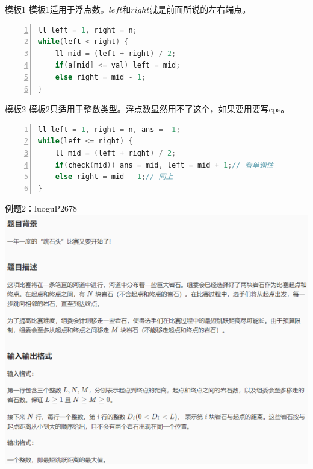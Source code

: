 \documentclass{beamer}[UTF-8]
\begin{document}
\begin{frame}{模板1}
 \pause
模板1适用于浮点数。$left$和$right$就是前面所说的左右端点。 \pause
\begin{lstlisting}[language = C++, numbers=left,
numberstyle=\tiny,keywordstyle=\color{blue!70},
commentstyle=\color{red!50!green!50!blue!50},frame=shadowbox,
rulesepcolor=\color{red!20!green!20!blue!20},basicstyle=\ttfamily]
ll left = 1, right = n;
while(left < right) {
    ll mid = (left + right) / 2;
    if(a[mid] <= val) left = mid;
    else right = mid - 1;
}
\end{lstlisting}
\end{frame}

\begin{frame}{模板2}
 \pause
模板2只适用于整数类型。浮点数显然用不了这个，如果要用要写eps。 \pause
\begin{lstlisting}[language = C++, numbers=left,
numberstyle=\tiny,keywordstyle=\color{blue!70},
commentstyle=\color{red!50!green!50!blue!50},frame=shadowbox,
rulesepcolor=\color{red!20!green!20!blue!20},basicstyle=\ttfamily]
ll left = 1, right = n, ans = -1;
while(left <= right) {
    ll mid = (left + right) / 2;
    if(check(mid)) ans = mid, left = mid + 1;// 看单调性
    else right = mid - 1;// 同上
}
\end{lstlisting}
\end{frame}

\begin{frame}{例题2：luoguP2678}
\includegraphics{luoguP2678.png}
\end{frame}
\end{document}
